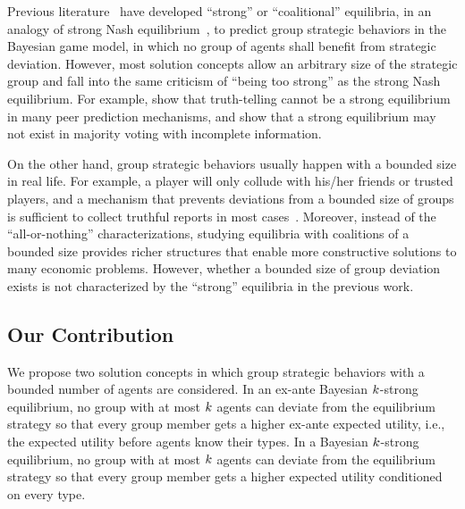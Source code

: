 Previous literature~\citep{ichiishi1996bayesian,schoenebeck21wisdom,guo2022robust} have developed ``strong'' or ``coalitional'' equilibria, in an analogy of strong Nash equilibrium~\citep{Aumann59:Acceptable}, to predict group strategic behaviors in the Bayesian game model, in which no group of agents shall benefit from strategic deviation.
However, most solution concepts allow an arbitrary size of the strategic group and fall into the same criticism of ``being too strong'' as the strong Nash equilibrium. For example, \citet{Gao2019incentivizing} show that truth-telling cannot be a strong equilibrium in many peer prediction mechanisms, and \citet{han2023wisdom} show that a strong equilibrium may not exist in majority voting with incomplete information.

On the other hand, group strategic behaviors usually happen with a bounded size in real life. For example, a player will only collude with his/her friends or trusted players, and a mechanism that prevents deviations from a bounded size of groups is sufficient to collect truthful reports in most cases~\citep{Shnayder2016practcal}. Moreover, instead of the ``all-or-nothing'' characterizations, studying equilibria with coalitions of a bounded size provides richer structures that enable more constructive solutions to many economic problems.
However, whether a bounded size of group deviation exists is not characterized by the ``strong'' equilibria in the previous work. 





\subsection{Our Contribution}

We propose two solution concepts in which group strategic behaviors with a bounded number of agents are considered.
In an ex-ante Bayesian $k$-strong equilibrium, no group with at most $k$ agents can deviate from the equilibrium strategy so that every group member gets a higher ex-ante expected utility, i.e., the expected utility before agents know their types. In a Bayesian $k$-strong equilibrium, no group with at most $k$ agents can deviate from the equilibrium strategy so that every group member gets a higher expected utility conditioned on every type. 

